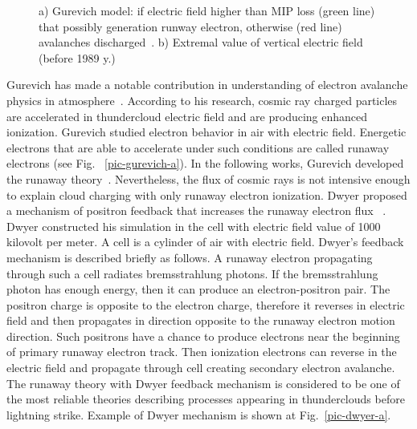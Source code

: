 \documentclass[utf8]{webofc}
\begin{document}
\begin{figure}[ht!]
\begin{subfigure}[b]{0.5\textwidth}
            \caption{}
            \label{pic-field-b}
        \end{subfigure}
        \caption{
            a) Gurevich model: if electric field higher than MIP loss (green line) that possibly generation runway electron, otherwise (red line) avalanches discharged~\cite{gurevich1992runaway}.
            b) Extremal value of vertical electric field (before 1989 y.)~\cite{mazin1989clouds}}
    \end{figure}
    
    Gurevich has made a notable contribution in understanding of electron avalanche physics in atmosphere~\cite{gurevich1992runaway}. According to his research, cosmic ray charged particles are accelerated in thundercloud electric field and are producing enhanced ionization. Gurevich studied electron behavior in air with electric field. Energetic electrons that are able to accelerate under such conditions are called runaway electrons (see Fig. ~\ref{pic-gurevich-a}). In the following works, Gurevich developed the runaway theory~\cite{gurevich1999lightning,gurevich2001kinetic}. Nevertheless, the flux of cosmic rays is not intensive enough to explain cloud charging with only runaway electron ionization.
    Dwyer proposed a mechanism of positron feedback that increases the runaway electron flux ~\cite{dwyer2003fundamental}. Dwyer constructed his simulation in the cell with electric field value of 1000 kilovolt per meter. A cell is a cylinder of air with electric field. Dwyer’s feedback mechanism is described briefly as follows. A runaway electron propagating through such a cell radiates bremsstrahlung photons. If the bremsstrahlung photon has enough energy, then it can produce an electron-positron pair. The positron charge is opposite to the electron charge, therefore it reverses in electric field and then propagates in direction opposite to the runaway electron motion direction. Such positrons have a chance to produce electrons near the beginning of primary runaway electron track. Then ionization electrons can reverse in the electric field and propagate through cell creating secondary electron avalanche. The runaway theory with Dwyer feedback mechanism is considered to be one of the most reliable theories describing processes appearing in thunderclouds before lightning strike. Example of Dwyer mechanism is shown at Fig.~\ref{pic-dwyer-a}.
    
\end{document}
